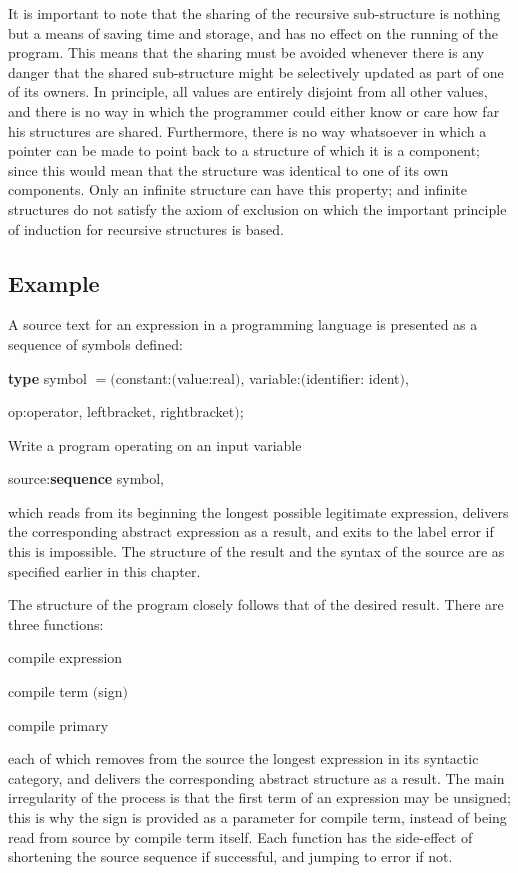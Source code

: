 It is important to note that the sharing of the recursive sub-structure is nothing but a means of saving time and storage, and has no effect on the running of the program. This means that the sharing must be avoided whenever there is any danger that the shared sub-structure might be selectively updated as part of one of its owners. In principle, all values are entirely disjoint from all other values, and there is no way in which the programmer could either know or care how far his structures are shared. Furthermore, there is no way whatsoever in which a pointer can be made to point back to a structure of which it is a component; since this would mean that the structure was identical to one of its own components. Only an infinite structure can have this property; and infinite structures do not satisfy the axiom of exclusion on which the important principle of induction for recursive structures is based.

\subsection{Example}
\label{sec:example-9-2}

A source text for an expression in a programming language is presented as a sequence of symbols defined:

\quad \textbf{type} symbol $= ($constant:$($value:real$)$, variable:$($identifier: ident$)$,

\tabto*{9.2em}op:operator, leftbracket, rightbracket$)$;

Write a program operating on an input variable

\quad source:\textbf{sequence} symbol,

\noindent
which reads from its beginning the longest possible legitimate expression, delivers the corresponding abstract expression as a result, and exits to the label error if this is impossible. The structure of the result and the syntax of the source are as specified earlier in this chapter.

The structure of the program closely follows that of the desired result. There are three functions:

\quad compile expression

\quad compile term $($sign$)$

\quad compile primary

\noindent
each of which removes from the source the longest expression in its syntactic category, and delivers the corresponding abstract structure as a result. The main irregularity of the process is that the first term of an expression may be unsigned; this is why the sign is provided as a parameter for compile term, instead of being read from source by compile term itself. Each function has the side-effect of shortening the source sequence if successful, and jumping to error if not.

